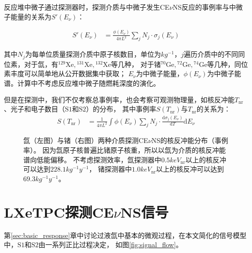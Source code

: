 反应堆中微子通过探测器时，探测介质与中微子发生CE$\nu$NS反应的事例率与中微子能量的关系为$S'(E_\nu)$：

\begin{align}
    \label{eq:sevent_rate}
    S'(E_\nu) &= \frac{\phi(E_\nu)}{4\pi L^2}\sum_j N_j\cdot \sigma_j(E_\nu)
\end{align}

其中$N_j$为每单位质量探测介质中原子核数目，单位为$\si{kg^{-1}}$，$j$遍历介质中的不同同位素，对于氙，有${}^{129}\mathrm{Xe},{}^{131}\mathrm{Xe},{}^{132}\mathrm{Xe}$等几种，
对于锗${}^{70}\mathrm{Ge},{}^{72}\mathrm{Ge},{}^{74}\mathrm{Ge}$等几种，同位素丰度可以简单地从公开数据集中获取；
$E_\nu$为中微子能量，$\phi(E_\nu)$为中微子能谱。计算中不考虑反应堆中微子随燃耗深度的演化。

但是在探测中，我们不仅考察总事例率，也会考察可观测物理量，如核反冲能$T_{\mathrm{nr}}$、光子和电子数目（$\mathrm{S1}$和$\mathrm{S2}$）的分布，
其中事例率$S(T_{\mathrm{nr}})$与$T_{\mathrm{nr}}$的关系为：
\begin{align}
    \label{eq:tnr_event_rate}
    S(T_{\mathrm{nr}}) &= \frac{1}{4\pi L^2}\int\phi(E_\nu)\sum_j N_j\cdot \frac{\mathrm{d}\sigma_j(E_\nu)}{\mathrm{d}T}\mathrm{d}E_\nu
\end{align}

\begin{figure}
    \centering
    
    \caption{\label{fig:cevns_event_rate} 氙（左图）与锗（右图）两种介质探测CE$\nu$NS的核反冲能分布（事例率）。
    因为氙原子核普遍比锗原子核重，所以以氙为介质的核反冲能谱向低能偏移。
    不考虑探测效率，氙探测器中$0.5\si{keV_{\mathrm{nr}}}$以上的核反冲可以达到$228.1\si{kg^{-1}y^{-1}}$，
    锗探测器中$1.0\si{keV_{\mathrm{nr}}}$以上的核反冲可以达到$69.3\si{kg^{-1}y^{-1}}$。}
\end{figure}

\section{LXeTPC探测CE$\nu$NS信号}
\label{sec:lxe_signal}

第\ref{sec:basic_response}章中讨论过液氙中基本的微观过程，在本文简化的信号模型中，$\mathrm{S1}$和$\mathrm{S2}$由一系列正比过程决定，
如图\ref{fig:signal_flow}。

